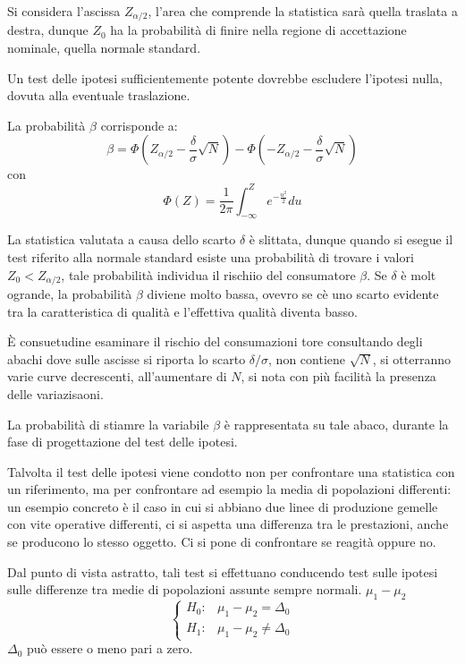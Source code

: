 Si considera l'ascissa $Z_{\alpha/2}$, l'area che comprende la statistica sarà quella traslata a destra, dunque $Z_0$ ha la probabilità di finire nella regione di accettazione nominale, quella normale standard.

Un test delle ipotesi sufficientemente potente dovrebbe escludere l'ipotesi nulla, dovuta alla eventuale traslazione.

La probabilità $\beta$ corrisponde a:
$$
\beta = \Phi\left(Z_{\alpha/2}-\frac{\delta}{\sigma}\sqrt{N}\right) - \Phi\left(-Z_{\alpha/2}-\frac{\delta}{\sigma}\sqrt{N}\right)
$$
con 
$$
\Phi(Z) = \frac{1}{2\pi} \int_{-\infty}^Z e^{-\frac{u^2}{2}}du
$$

La statistica valutata a causa dello scarto $\delta$ è slittata, dunque quando 
si esegue il test riferito alla normale standard esiste una probabilità di 
trovare i valori $Z_0 < Z_{\alpha/2}$, tale probabilità individua il rischiio 
del consumatore $\beta$. Se $\delta$ è molt ogrande, la probabilità $\beta$ 
diviene molto bassa, ovevro se cè uno scarto evidente tra la caratteristica di 
qualità e l'effettiva qualità diventa basso.

È consuetudine esaminare il rischio del consumazioni tore consultando degli abachi dove sulle ascisse si riporta lo scarto $\delta/\sigma$, non contiene $\sqrt{N}$, si otterranno varie curve decrescenti, all'aumentare di $N$, si nota con più facilità la presenza delle variazisaoni.

La probabilità di stiamre la variabile $\beta$ è rappresentata su tale abaco, durante la fase di progettazione del test delle ipotesi.

Talvolta il test delle ipotesi viene condotto non per confrontare una 
statistica con un riferimento, ma per confrontare ad esempio la media di 
popolazioni differenti: un esempio concreto è il caso in cui si abbiano due 
linee di produzione gemelle con vite operative differenti, ci si aspetta una 
differenza tra le prestazioni, anche se producono lo stesso oggetto. Ci si pone 
di confrontare se reagità oppure no.

Dal punto di vista astratto, tali test si effettuano conducendo test sulle ipotesi sulle differenze tra medie di popolazioni assunte sempre normali.
$
\mu_1 - \mu_2
$
$$
\begin{cases}
    H_0: & \mu_1-\mu_2 = \Delta_0 \\
    H_1: & \mu_1-\mu_2 \neq \Delta_0 
\end{cases}
$$
$\Delta_0$ può essere o meno pari a zero.

